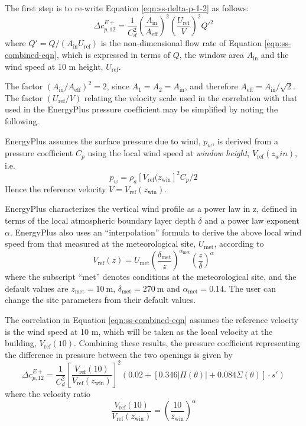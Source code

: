 The first step is to re-write Equation \ref{eqn:ss-delta-p-1-2} as follows:
\begin{equation}
\Delta c_{p,12}^{E+} = \frac{1}{C_d^2}  \left(\frac{A_\text{in}}{A_\text{eff}}\right)^2 \left(\frac{U_\text{ref}}{V}\right)^2 Q'^2
\end{equation}
where $Q' = Q/(A_\text{in}U_\text{ref})$ is the non-dimensional flow rate of Equation \ref{eqn:ss-combined-eqn}, which is expressed in terms of $Q$, the window area $A_\text{in}$ and the wind speed at 10 m height, $U_\text{ref}$.

The factor $\left(A_\text{in}/A_\text{eff}\right)^2 = 2$, since $A_1 = A_2 = A_\text{in}$, and therefore $A_\text{eff} = A_\text{in}/\sqrt{2}$. The factor $(U_\text{ref}/V)$ relating the velocity scale used in the correlation with that used in the EnergyPlus pressure coefficient may be simplified by noting the following.

EnergyPlus assumes the surface pressure due to wind, $p_w$, is derived from a pressure
coefficient $C_p$ using the local wind speed at \textit{window height}, $V_\text{ref}(z_win)$,
i.e.
\begin{equation}
p_w=\rho_a \left[V_\text{ref}(z_\text{win}\right]^2 C_p/2
\end{equation}
Hence the reference velocity $V =  V_\text{ref}(z_\text{win})$.

EnergyPlus characterizes the vertical wind profile as a power law in z, defined in terms of the local atmospheric boundary layer depth $\delta$ and a power law exponent $\alpha$. EnergyPlus also uses an ``interpolation'' formula to derive the above local wind speed from that measured at the meteorological site, $U_\text{met}$, according to
\begin{equation}
V_\text{ref}(z)= U_\text{met} \left(\frac{\delta_\text{met}}{z}\right)^{\alpha_\text{met}}
\left(\frac{z}{\delta}\right)^\alpha
\end{equation}
where the subscript ``met'' denotes conditions at the meteorological site, and the default values are $z_\text{met} = 10\ \text{m}$, $\delta_\text{met} = 270\ \text{m}$ and $\alpha_\text{met} = 0.14$. The user can change the site parameters from their default values.

The correlation in Equation \ref{eqn:ss-combined-eqn} assumes the reference velocity is the wind speed at 10 m, which will be taken as the local velocity at the building, $V_\text{ref}(10)$.
Combining these results, the pressure coefficient representing the difference in pressure between the two openings is given by
\begin{equation}
\Delta c_{p,12}^{E+} = \frac{1}{C_d^2} \left[ \frac{V_\text{ref}(10)}{V_\text{ref}(z_\text{win})} \right]^2 \left(0.02+\left[0.346 |\Pi(\theta)|+0.084 \Sigma(\theta)\right]{\cdot}s'\right)
\end{equation}
where the velocity ratio
\begin{equation}
\frac{V_\text{ref}(10)}{V_\text{ref}(z_\text{win})} = \left(\frac{10}{z_\text{win}}\right)^\alpha
\end{equation}

